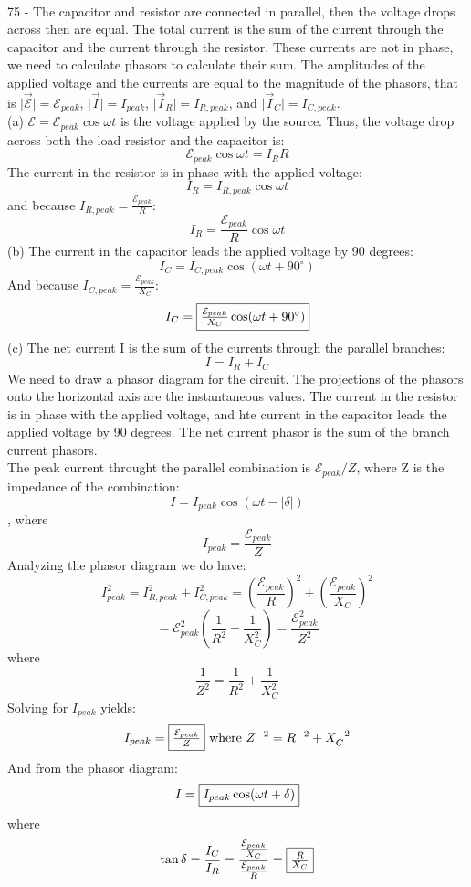 \documentclass{report}
\begin{document}
\paragraph{}
75 - The capacitor and resistor are connected in parallel, then the voltage drops across then are equal. The total current is the sum of the current through the capacitor and the current through the resistor. These currents are not in phase, we need to calculate phasors to calculate their sum. The amplitudes of the applied voltage and the currents are equal to the magnitude of the phasors, that is $\lvert \mathcal{\vec E} \rvert = \mathcal{E}_{peak}$, $\lvert \vec I \rvert = I_{peak}$, $\lvert \vec I_R \rvert = I_{R, peak}$, and $\lvert \vec I_C \rvert = I_{C, peak}$.\\
(a) $\mathcal{E} = \mathcal{E}_{peak} \cos \omega t$ is the voltage applied by the source. Thus, the voltage drop across both the load resistor and the capacitor is:
$$\mathcal{E}_{peak} \cos \omega t = I_RR$$
The current in the resistor is in phase with the applied voltage:
$$I_R = I_{R, peak} \cos \omega t$$
and because $I_{R, peak} = \frac{\mathcal{E}_{peak}}{R}$:
$$I_R = \frac{\mathcal{E}_{peak}}{R} \cos \omega t$$
(b) The current in the capacitor leads the applied voltage by 90 degrees:
$$I_C = I_{C, peak} \cos (\omega t + 90^{\circ})$$
And because $I_{C, peak} = \frac{\mathcal{E}_{peak}}{X_C}$:
$$I_C = \fbox{$\frac{\mathcal{E}_{peak}}{X_C} \cos (\omega t + 90^{\circ})$}$$
(c) The net current I is the sum of the currents through the parallel branches:
$$I = I_R + I_C$$
We need to draw a phasor diagram for the circuit. The projections of the phasors onto the horizontal axis are the instantaneous values. The current in the resistor is in phase with the applied voltage, and hte current in the capacitor leads the applied voltage by 90 degrees. The net current phasor is the sum of the branch current phasors.\\
The peak current throught the parallel combination is $\mathcal{E}_{peak} / Z$, where Z is the impedance of the combination:
$$I = I_{peak} \cos (\omega t - \lvert \delta \rvert)$$,
where
$$I_{peak} = \frac{\mathcal{E}_{peak}}{Z}$$
Analyzing the phasor diagram we do have:
$$I_{peak}^2 = I_{R, peak}^2 + I_{C, peak}^2 = \left( \frac{\mathcal{E}_{peak}}{R} \right)^2 + \left( \frac{\mathcal{E}_{peak}}{X_C} \right)^2$$
$$= \mathcal{E}_{peak}^2 \left( \frac{1}{R^2} + \frac{1}{X_C^2} \right) = \frac{\mathcal{E}_{peak}^2}{Z^2}$$
where
$$\frac{1}{Z^2} = \frac{1}{R^2} + \frac{1}{X_C^2}$$
Solving for $I_{peak}$ yields:
$$I_{peak} = \fbox{$\frac{\mathcal{E}_{peak}}{Z}$} \text{ where } Z^{-2} = R^{-2} + X_C^{-2}$$
And from the phasor diagram:
$$I = \fbox{$I_{peak} \cos (\omega t + \delta)$}$$
where
$$\tan \delta = \frac{I_C}{I_R} = \frac{\frac{\mathcal{E}_{peak}}{X_C}}{\frac{\mathcal{E}_{peak}}{R}} = \fbox{$\frac{R}{X_C}$}$$
\end{document}
